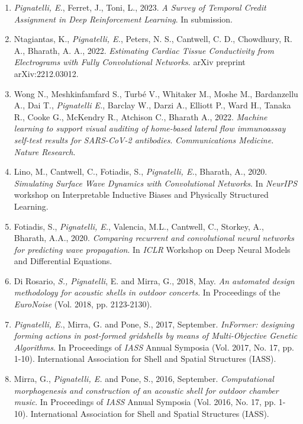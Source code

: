 \begin{publications}
    \begin{enumerate}[leftmargin=0.45cm, itemsep=0em, topsep=0.5em, parsep=0.2em]
        \item \emph{Pignatelli, E.}, Ferret, J., Toni, L., 2023. \textit{A Survey of Temporal Credit Assignment in Deep Reinforcement Learning}. In submission.
        \item Ntagiantas, K., \emph{Pignatelli, E.}, Peters, N. S., Cantwell, C. D., Chowdhury, R. A., Bharath, A. A., 2022. \textit{Estimating Cardiac Tissue Conductivity from Electrograms with Fully Convolutional Networks}. arXiv preprint arXiv:2212.03012.
        \item Wong N., Meshkinfamfard S., Turbé V., Whitaker M., Moshe M., Bardanzellu A., Dai T., \emph{Pignatelli E.}, Barclay W., Darzi A., Elliott P., Ward H., Tanaka R., Cooke G., McKendry R., Atchison C., Bharath A., 2022. \textit{Machine learning to support visual auditing of home-based lateral flow immunoassay self-test results for SARS-CoV-2 antibodies}. \emph{Communications Medicine. Nature Research}.
        \item Lino, M., Cantwell, C., Fotiadis, S., \emph{Pignatelli, E.}, Bharath, A., 2020. \textit{Simulating Surface Wave Dynamics with Convolutional Networks}. In \emph{NeurIPS} workshop on Interpretable Inductive Biases and Physically Structured Learning.
        \item Fotiadis, S., \emph{Pignatelli, E.}, Valencia, M.L., Cantwell, C., Storkey, A., Bharath, A.A., 2020. \textit{Comparing recurrent and convolutional neural networks for predicting wave propagation}. In \emph{ICLR} Workshop on Deep Neural Models and Differential Equations.
        \item Di Rosario, \emph{S., Pignatelli}, E. and Mirra, G., 2018, May. \textit{An automated design methodology for acoustic shells in outdoor concerts}. In Proceedings of the \emph{EuroNoise} (Vol. 2018, pp. 2123-2130).
        \item \emph{Pignatelli, E.}, Mirra, G. and Pone, S., 2017, September. \textit{InFormer: designing forming actions in post-formed gridshells by means of Multi-Objective Genetic Algorithms}. In Proceedings of \emph{IASS} Annual Symposia (Vol. 2017, No. 17, pp. 1-10). International Association for Shell and Spatial Structures (IASS).
        \item Mirra, G., \emph{Pignatelli, E.} and Pone, S., 2016, September. \textit{Computational morphogenesis and construction of an acoustic shell for outdoor chamber music}. In Proceedings of \emph{IASS} Annual Symposia (Vol. 2016, No. 17, pp. 1-10). International Association for Shell and Spatial Structures (IASS).

\end{enumerate}
\end{publications}
